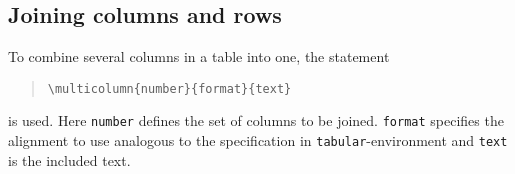 

\subsection{Joining columns and rows}

To combine several columns in a table into one, the statement
%
\begin{quote}
    \verb!\multicolumn{number}{format}{text}!
\end{quote}
%
is used. Here \texttt{number} defines the set of columns to be joined.
\texttt{format} specifies the alignment to use analogous to the specification
in \texttt{tabular}-environment and \texttt{text} is the included text.

